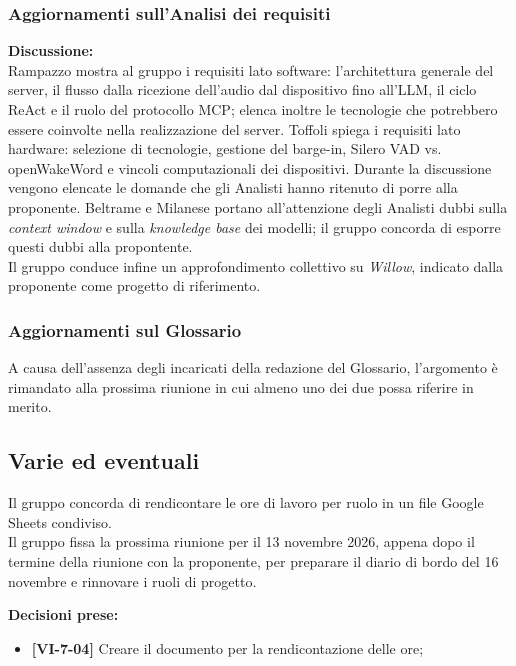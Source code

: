 \documentclass[12pt,a4paper]{article}
\newcommand{\tightlist}{\setlength{\itemsep}{1pt}\setlength{\parskip}{0pt}}
\begin{document}
\subsubsection{Aggiornamenti sull'Analisi dei requisiti}
\textbf{Discussione:} \\
Rampazzo mostra al gruppo i requisiti lato software: l'architettura generale del server, il flusso dalla ricezione dell'audio dal dispositivo fino all'LLM, il ciclo ReAct e il ruolo del protocollo MCP; elenca inoltre le tecnologie che potrebbero essere coinvolte nella realizzazione del server.
Toffoli spiega i requisiti lato hardware: selezione di tecnologie, gestione del barge-in, Silero VAD vs. openWakeWord e vincoli computazionali dei dispositivi. Durante la discussione vengono elencate le domande che gli Analisti hanno ritenuto di porre alla proponente. Beltrame e Milanese portano all'attenzione degli Analisti dubbi sulla \textit{context window} e sulla \textit{knowledge base} dei modelli; il gruppo concorda di esporre questi dubbi alla propontente. \\
Il gruppo conduce infine un approfondimento collettivo su \textit{Willow}, indicato dalla proponente come progetto di riferimento.

\subsubsection{Aggiornamenti sul Glossario}
A causa dell'assenza degli incaricati della redazione del Glossario, l'argomento è rimandato alla prossima riunione in cui almeno uno dei due possa riferire in merito.

\newpage

\hypertarget{varie-ed-eventuali}{%
\subsection{Varie ed eventuali}}
Il gruppo concorda di rendicontare le ore di lavoro per ruolo in un file Google Sheets condiviso. \\
Il gruppo fissa la prossima riunione per il 13 novembre 2026, appena dopo il termine della riunione con la proponente, per preparare il diario di bordo del 16 novembre e rinnovare i ruoli di progetto.

\textbf{Decisioni prese:}
\begin{itemize}
\tightlist
\item[$\checkmark$] \textbf{[VI-7-04]} Creare il documento per la rendicontazione delle ore;
\end{itemize}
\end{document}
